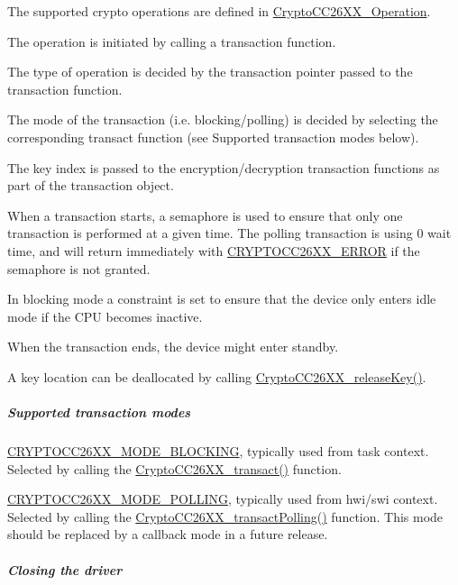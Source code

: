 \begin{DoxyItemize}
\item The supported crypto operations are defined in \hyperlink{_crypto_c_c26_x_x_8h_a28465385e5b45efecc00f2015605f970}{Crypto\-C\-C26\-X\-X\-\_\-\-Operation}.
\item The operation is initiated by calling a transaction function.
\item The type of operation is decided by the transaction pointer passed to the transaction function.
\item The mode of the transaction (i.\-e. blocking/polling) is decided by selecting the corresponding transact function (see Supported transaction modes below).
\item The key index is passed to the encryption/decryption transaction functions as part of the transaction object.
\item When a transaction starts, a semaphore is used to ensure that only one transaction is performed at a given time. The polling transaction is using 0 wait time, and will return immediately with \hyperlink{_crypto_c_c26_x_x_8h_ae56a5165f1674a8a78b77c45ff7d7a5c}{C\-R\-Y\-P\-T\-O\-C\-C26\-X\-X\-\_\-\-E\-R\-R\-O\-R} if the semaphore is not granted.
\item In blocking mode a constraint is set to ensure that the device only enters idle mode if the C\-P\-U becomes inactive.
\item When the transaction ends, the device might enter standby.
\item A key location can be deallocated by calling \hyperlink{_crypto_c_c26_x_x_8h_aa995ee20d8a7fcce66aeae86fee83555}{Crypto\-C\-C26\-X\-X\-\_\-release\-Key()}.
\end{DoxyItemize}\subparagraph*{Supported transaction modes}


\begin{DoxyItemize}
\item \hyperlink{_crypto_c_c26_x_x_8h_abf86c8ac428559f00fed3299d439e2cdaf0a9faf35a12d014c5f3a475906a3373}{C\-R\-Y\-P\-T\-O\-C\-C26\-X\-X\-\_\-\-M\-O\-D\-E\-\_\-\-B\-L\-O\-C\-K\-I\-N\-G}, typically used from task context. Selected by calling the \hyperlink{_crypto_c_c26_x_x_8h_a6864191d34a9a3cfbcd36cc34570b3b8}{Crypto\-C\-C26\-X\-X\-\_\-transact()} function.
\item \hyperlink{_crypto_c_c26_x_x_8h_abf86c8ac428559f00fed3299d439e2cda015c9e0e35350eb92ede6ad4109fa50b}{C\-R\-Y\-P\-T\-O\-C\-C26\-X\-X\-\_\-\-M\-O\-D\-E\-\_\-\-P\-O\-L\-L\-I\-N\-G}, typically used from hwi/swi context. Selected by calling the \hyperlink{_crypto_c_c26_x_x_8h_a2efbef5e059c752e1f5797a4ef3713a3}{Crypto\-C\-C26\-X\-X\-\_\-transact\-Polling()} function. This mode should be replaced by a callback mode in a future release.
\end{DoxyItemize}\subparagraph*{Closing the driver}

